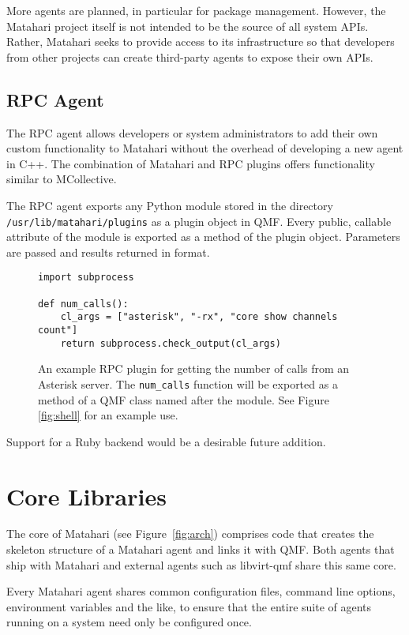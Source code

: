 \documentclass{tufte-handout}
\begin{document}
More agents are planned, in particular for package management.
However, the Matahari project itself is not intended to be the source of all system APIs. Rather, Matahari seeks to provide access to its infrastructure so that developers from other projects can create third-party agents to expose their own APIs.

\subsection{RPC Agent}

The RPC agent allows developers or system administrators to add their own custom functionality to Matahari without the overhead of developing a new agent in C++. The combination of Matahari and RPC plugins offers functionality similar to MCollective.

The RPC agent exports any Python module stored in the directory \Verb|/usr/lib/matahari/plugins| as a plugin object in QMF. Every public, callable attribute of the module is exported as a method of the plugin object. Parameters are passed and results returned in  format.

\begin{figure}[hb]
\begin{Verbatim}
import subprocess

def num_calls():
    cl_args = ["asterisk", "-rx", "core show channels count"]
    return subprocess.check_output(cl_args)
\end{Verbatim}
\caption{An example RPC plugin for getting the number of calls from an Asterisk server. The \texttt{num\_calls} function will be exported as a method of a QMF class named after the module. See Figure \ref{fig:shell} for an example use.}
\label{fig:rpc}
\end{figure}

Support for a Ruby backend would be a desirable future addition.

\section{Core Libraries}

The core of Matahari (see Figure~\ref{fig:arch}) comprises code that creates the skeleton structure of a Matahari agent and links it with QMF. Both agents that ship with Matahari and external agents such as libvirt-qmf share this same core.

Every Matahari agent shares common configuration files, command line options, environment variables and the like, to ensure that the entire suite of agents running on a system need only be configured once.
\end{document}
